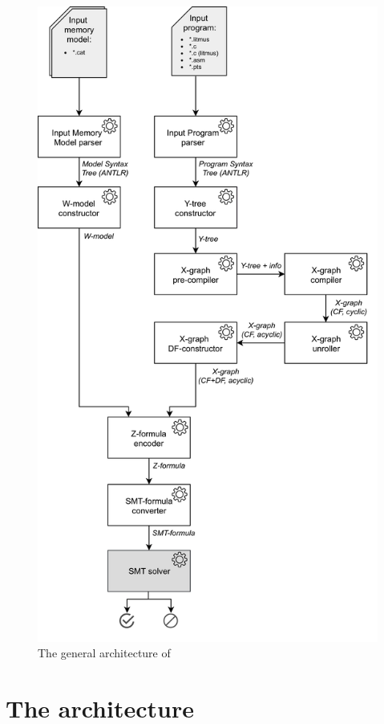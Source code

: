 \begin{figure}
  \centering
  \includegraphics[height=.99\textheight,keepaspectratio]{img/my/draw.io/general_arch-no_numbering.png} %
  \caption{The general architecture of \porthos[2]}
  \label{fig:arch}
\end{figure}

\section{The architecture}
\label{ch:impl:arch}

